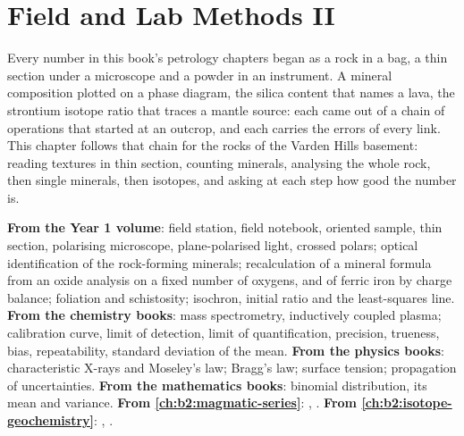\chapter{Field and Lab Methods II}\label{ch:b2:field-lab-methods-2}

Every number in this book's petrology chapters began as a rock in a bag, a thin section under a
microscope and a powder in an instrument. A mineral composition plotted on a phase diagram, the
silica content that names a lava, the strontium isotope ratio that traces a mantle source: each
came out of a chain of operations that started at an outcrop, and each carries the errors of every
link. This chapter follows that chain for the rocks of the Varden Hills basement: reading textures
in thin section, counting minerals, analysing the whole rock, then single minerals, then isotopes,
and asking at each step how good the number is.

\begin{recall}
\textbf{From the Year 1 volume}: field station, field notebook, oriented sample, thin section,
polarising microscope, plane-polarised light, crossed polars; optical identification of the rock-forming
minerals; recalculation of a mineral formula from an oxide analysis on a fixed number of oxygens,
and of ferric iron by charge balance; foliation and schistosity; isochron, initial ratio and the
least-squares line. \textbf{From the chemistry books}: mass spectrometry, inductively coupled plasma;
calibration curve, limit of detection, limit of quantification, precision, trueness, bias,
repeatability, standard deviation of the mean. \textbf{From the physics books}: characteristic X-rays
and Moseley's law; Bragg's law; surface tension; propagation of uncertainties.
\textbf{From the mathematics books}: binomial distribution, its mean and variance.
\textbf{From \cref{ch:b2:magmatic-series}}: , .
\textbf{From \cref{ch:b2:isotope-geochemistry}}: , .
\end{recall}

